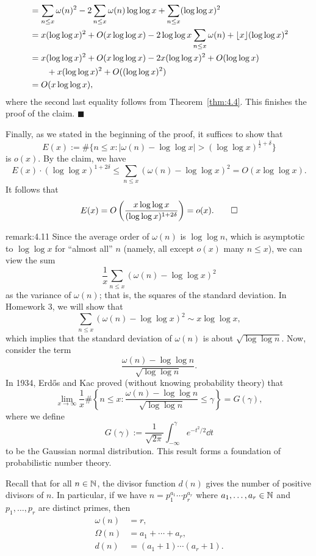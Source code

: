 \begin{pf}
\begin{align*}
        &= \sum_{n\leq x} \omega(n)^2 - 2\sum_{n\leq x} \omega(n)\log\log x 
        + \sum_{n\leq x} (\log\log x)^2 \\ 
        &= x(\log\log x)^2 + O(x\log\log x) - 2\log\log x \sum_{n\leq x} \omega(n)
        + \lfloor x\rfloor (\log\log x)^2 \\ 
        &= x(\log\log x)^2 + O(x\log\log x) - 2x(\log\log x)^2 + O(\log\log x) \\
        &\qquad + x(\log\log x)^2 + O((\log\log x)^2) \\ 
        &= O(x\log\log x), 
    \end{align*}
    where the second last equality follows from Theorem~\ref{thm:4.4}. This 
    finishes the proof of the claim. \hfill $\blacksquare$ 

    Finally, as we stated in the beginning of the proof, it suffices to show that 
    \[ E(x) := \#\{n \leq x : |\omega(n) - \log\log x| > (\log\log x)^{\frac12+\delta}\} \] 
    is $o(x)$. By the claim, we have 
    \[ E(x) \cdot (\log\log x)^{1+2\delta} 
    \leq \sum_{n\leq x} (\omega(n) - \log\log x)^2 = O(x\log\log x). \] 
    It follows that 
    \[ E(x) = O\left( \frac{x\log\log x}{(\log\log x)^{1+2\delta}} 
    \right) = o(x). \qedhere \] 
\end{pf}

\begin{remark}{remark:4.11}
    Since the average order of $\omega(n)$ is $\log\log n$, which is asymptotic 
    to $\log\log x$ for ``almost all'' $n$ (namely, all except $o(x)$ 
    many $n \leq x$), we can view the sum 
    \[ \frac1x \sum_{n\leq x} (\omega(n) - \log\log x)^2 \] 
    as the variance of $\omega(n)$; that is, the squares of the standard deviation. 
    In Homework 3, we will show that 
    \[ \sum_{n\leq x} (\omega(n) - \log\log x)^2 \sim x\log\log x, \] 
    which implies that the standard deviation of $\omega(n)$ is about 
    $\sqrt{\log\log n}$. Now, consider the term 
    \[ \frac{\omega(n) - \log\log n}{\sqrt{\log\log n}}. \] 
    In 1934, Erd\H{o}s and Kac proved (without knowing probability theory) that 
    \[ \lim_{x\to\infty} \frac1x \#\left\{ n\leq x : \frac{\omega(n) - 
    \log\log n}{\sqrt{\log\log n}} \leq \gamma \right\} = G(\gamma), \] 
    where we define 
    \[ G(\gamma) := \frac{1}{\sqrt{2\pi}} \int_{-\infty}^{\gamma} e^{-t^2/2}\dd t \] 
    to be the Gaussian normal distribution. This result forms a foundation 
    of probabilistic number theory. 
\end{remark}

Recall that for all $n \in \mathbb{N}$, the divisor function $d(n)$ gives the number of 
positive divisors of $n$. In particular, if we have $n = p_1^{a_1} \cdots p_r^{a_r}$
where $a_1, \dots, a_r \in \mathbb{N}$ and $p_1, \dots, p_r$ are distinct primes, then
\begin{align*} 
    \omega(n) &= r, \\ 
    \Omega(n) &= a_1 + \cdots + a_r, \\ 
    d(n) &= (a_1 + 1) \cdots (a_r + 1). 
\end{align*}

